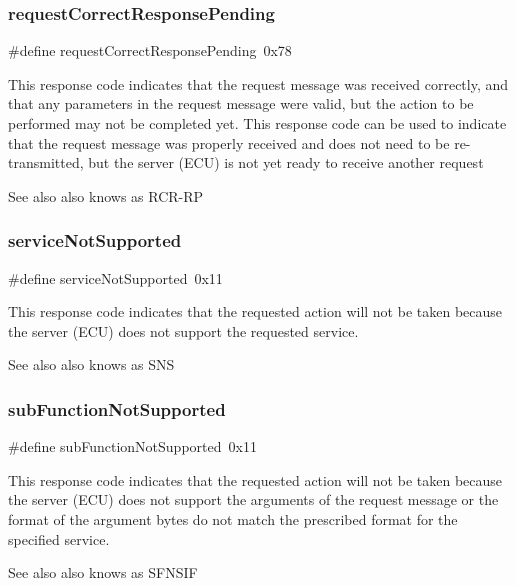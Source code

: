 \subsubsection{\texorpdfstring{request\+Correct\+Response\+Pending}{requestCorrectResponsePending}}
{\footnotesize\ttfamily \#define request\+Correct\+Response\+Pending~0x78}

This response code indicates that the request message was received correctly, and that any parameters in the request message were valid, but the action to be performed may not be completed yet. This response code can be used to indicate that the request message was properly received and does not need to be re-\/transmitted, but the server (E\+CU) is not yet ready to receive another request \begin{DoxySeeAlso}{See also}
also knows as R\+C\+R-\/\+RP 
\end{DoxySeeAlso}
\mbox{\label{group__OBD__STATUS_ga1bf8ad3c3e7062832dcd4ebe32728935}} 
\subsubsection{\texorpdfstring{service\+Not\+Supported}{serviceNotSupported}}
{\footnotesize\ttfamily \#define service\+Not\+Supported~0x11}

This response code indicates that the requested action will not be taken because the server (E\+CU) does not support the requested service. \begin{DoxySeeAlso}{See also}
also knows as S\+NS 
\end{DoxySeeAlso}
\mbox{\label{group__OBD__STATUS_ga141faa9667e91c77460104aa475b4514}} 
\subsubsection{\texorpdfstring{sub\+Function\+Not\+Supported}{subFunctionNotSupported}}
{\footnotesize\ttfamily \#define sub\+Function\+Not\+Supported~0x11}

This response code indicates that the requested action will not be taken because the server (E\+CU) does not support the arguments of the request message or the format of the argument bytes do not match the prescribed format for the specified service. \begin{DoxySeeAlso}{See also}
also knows as S\+F\+N\+S\+IF 
\end{DoxySeeAlso}
